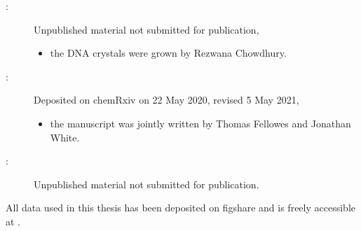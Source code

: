 {\begin{description}
    \item[:] Unpublished material not submitted for publication,
    \begin{itemize}
        \item the DNA crystals were grown by Rezwana Chowdhury.
    \end{itemize}
    \item[:] Deposited on chemRxiv on 22 May 2020, revised 5 May 2021,
    \begin{itemize}
        \item the manuscript was jointly written by Thomas Fellowes and Jonathan White.
    \end{itemize}
    \item[:] Unpublished material not submitted for publication.
\end{description}

All data used in this thesis has been deposited on figshare and is freely accessible at .
}